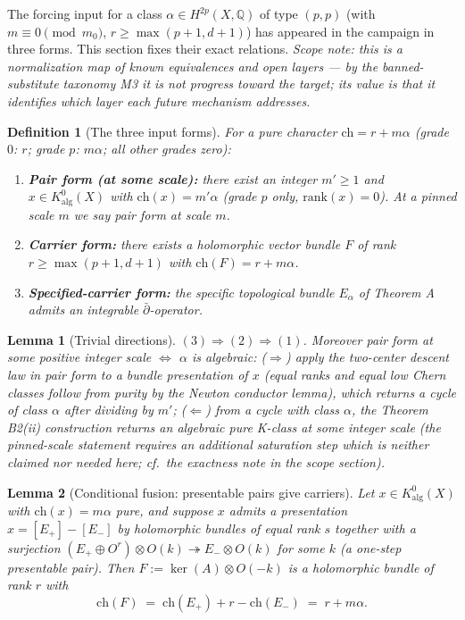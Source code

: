 \documentclass[11pt]{article}
\newtheorem{lemma}{Lemma}
\newtheorem{definition}{Definition}
\begin{document}
The forcing input for a class $\alpha\in H^{2p}(X,\mathbb{Q})$ of type $(p,p)$ (with $m\equiv0 \pmod{m_0}$,
$r\ge\max(p+1,d+1)$) has appeared in the campaign in three forms. This section fixes their exact
relations. \emph{Scope note: this is a normalization map of known equivalences and open layers --- by the
banned-substitute taxonomy M3 it is not progress toward the target; its value is that it identifies which layer
each future mechanism addresses.}

\begin{definition}[The three input forms]
For a pure character $\mathrm{ch}=r+m\alpha$ (grade $0$: $r$; grade $p$: $m\alpha$; all other grades zero):
\begin{enumerate}[label=(\arabic*)]
\item \textbf{Pair form (at some scale):} there exist an integer $m'\ge1$ and $x\in K^0_{\mathrm{alg}}(X)$ with
$\mathrm{ch}(x)=m'\alpha$ (grade $p$ only, $\mathrm{rank}(x)=0$). At a pinned scale $m$ we say \emph{pair form at scale $m$}.
\item \textbf{Carrier form:} there exists a holomorphic vector bundle $F$ of rank $r\ge\max(p+1,d+1)$ with
$\mathrm{ch}(F)=r+m\alpha$.
\item \textbf{Specified-carrier form:} the specific topological bundle $E_\alpha$ of Theorem A admits an integrable
$\bar\partial$-operator.
\end{enumerate}
\end{definition}

\begin{lemma}[Trivial directions]\label{lem:trivial}
$(3)\Rightarrow(2)\Rightarrow(1)$. Moreover \emph{pair form at some positive integer scale} $\Leftrightarrow$
$\alpha$ is algebraic: ($\Rightarrow$) apply the two-center descent law in pair form to a bundle presentation of $x$
(equal ranks and equal low Chern classes follow from purity by the Newton conductor lemma), which returns a
cycle of class $\alpha$ after dividing by $m'$; ($\Leftarrow$) from a cycle with class $\alpha$, the Theorem
B2(ii) construction returns an algebraic pure K-class at \emph{some} integer scale (the pinned-scale statement
requires an additional saturation step which is neither claimed nor needed here; cf.\ the exactness note in the
scope section).
\end{lemma}

\begin{lemma}[Conditional fusion: presentable pairs give carriers]\label{lem:fusion}
Let $x\in K^0_{\mathrm{alg}}(X)$ with $\mathrm{ch}(x)=m\alpha$ pure, and suppose $x$ admits a presentation
$x=[E_+]-[E_-]$ by holomorphic bundles of equal rank $s$ together with a surjection
$(E_+\oplus O^{r})\otimes O(k)\twoheadrightarrow E_-\otimes O(k)$ for some $k$ (a \emph{one-step presentable} pair).
Then $F:=\ker(A)\otimes O(-k)$ is a holomorphic bundle of rank $r$ with
\[
\mathrm{ch}(F)\;=\;\mathrm{ch}(E_+)+r-\mathrm{ch}(E_-)\;=\;r+m\alpha .
\]
\end{lemma}
\end{document}
